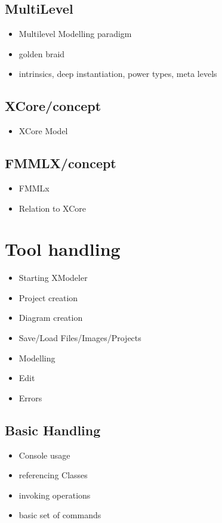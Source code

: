 \documentclass[10pt,a4paper]{report}
\begin{document}
\subsection{MultiLevel}
\label{sub:MultiLevel}
\begin{itemize}
\item Multilevel Modelling paradigm
\item golden braid
\item intrinsics, deep instantiation, power types, meta levels
\end{itemize}

\subsection{XCore/concept}
\label{sub:XCore/concept}
\begin{itemize}
\item XCore Model
\end{itemize}

\subsection{FMMLX/concept}
\label{sub:FMMLX/concept}
\begin{itemize}
\item FMMLx
\item Relation to XCore
\end{itemize}

\section{Tool handling}
\label{sec:Tool handling}
\begin{itemize}
\item Starting XModeler
\item Project creation
\item Diagram creation
\item Save/Load Files/Images/Projects
\item Modelling
\item Edit
\item Errors
\end{itemize}

\subsection{Basic Handling}
\label{sub:Basic Handling}
\begin{itemize}
\item Console usage
\item referencing Classes
\item invoking operations
\item basic set of commands
\end{itemize}
\end{document}
